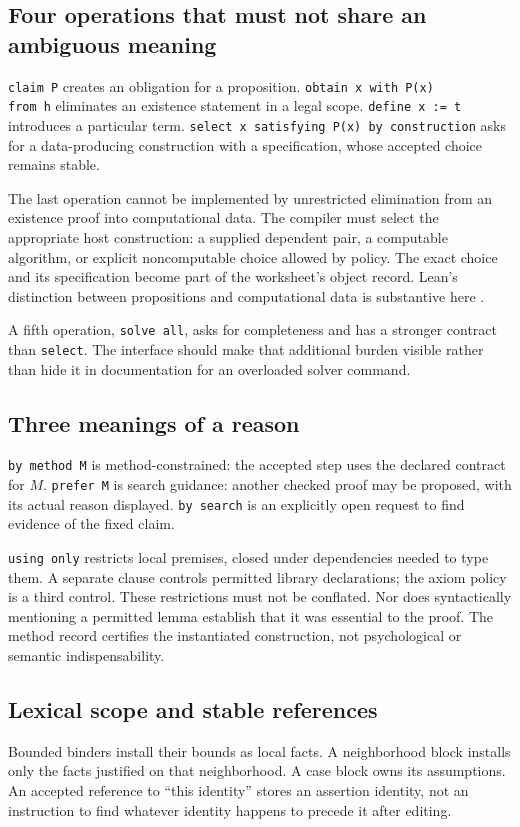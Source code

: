 \documentclass[11pt,a4paper]{article}
\newcommand{\code}[1]{\nolinkurl{#1}}
\theoremstyle{definition}
\begin{document}
\subsection{Four operations that must not share an ambiguous meaning}
\code{claim P} creates an obligation for a proposition. \code{obtain x with P(x)
from h} eliminates an existence statement in a legal scope. \code{define x := t}
introduces a particular term. \code{select x satisfying P(x) by construction}
asks for a data-producing construction with a specification, whose accepted
choice remains stable.

The last operation cannot be implemented by unrestricted elimination from an
existence proof into computational data. The compiler must select the appropriate
host construction: a supplied dependent pair, a computable algorithm, or explicit
noncomputable choice allowed by policy. The exact choice and its specification
become part of the worksheet's object record. Lean's distinction between
propositions and computational data is substantive here \cite{lean-prop}.

A fifth operation, \code{solve all}, asks for completeness and has a stronger
contract than \code{select}. The interface should make that additional burden
visible rather than hide it in documentation for an overloaded solver command.

\subsection{Three meanings of a reason}
\code{by method M} is method-constrained: the accepted step uses the declared
contract for $M$. \code{prefer M} is search guidance: another checked proof may
be proposed, with its actual reason displayed. \code{by search} is an explicitly
open request to find evidence of the fixed claim.

\code{using only} restricts local premises, closed under dependencies needed to
type them. A separate clause controls permitted library declarations; the axiom
policy is a third control. These restrictions must not be conflated. Nor does
syntactically mentioning a permitted lemma establish that it was essential to
the proof. The method record certifies the instantiated construction, not
psychological or semantic indispensability.

\subsection{Lexical scope and stable references}
Bounded binders install their bounds as local facts. A neighborhood block installs
only the facts justified on that neighborhood. A case block owns its assumptions.
An accepted reference to ``this identity'' stores an assertion identity, not an
instruction to find whatever identity happens to precede it after editing.
\end{document}
